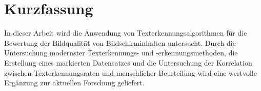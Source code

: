 \chapter{Kurzfassung}

In dieser Arbeit wird die Anwendung von Texterkennungsalgorithmen für die Bewertung der Bildqualität von Bildschirminhalten untersucht.
Durch die Untersuchung modernster Texterkennungs- und -erkennungsmethoden, die Erstellung eines markierten Datensatzes und die Untersuchung der Korrelation zwischen Texterkennungsraten und menschlicher Beurteilung wird eine wertvolle Ergänzung zur aktuellen Forschung geliefert.

